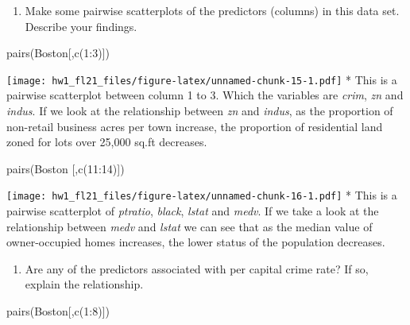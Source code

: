 \documentclass[
]{article}
\newenvironment{Shaded}{\begin{snugshade}}{\end{snugshade}}
\newcommand{\DecValTok}[1]{\textcolor[rgb]{0.00,0.00,0.81}{#1}}
\newcommand{\FunctionTok}[1]{\textcolor[rgb]{0.00,0.00,0.00}{#1}}
\newcommand{\NormalTok}[1]{#1}
\newcommand{\SpecialCharTok}[1]{\textcolor[rgb]{0.00,0.00,0.00}{#1}}
\providecommand{\tightlist}{%
  \setlength{\itemsep}{0pt}\setlength{\parskip}{0pt}}
\begin{document}
\begin{enumerate}
\def\labelenumi{(\alph{enumi})}
\setcounter{enumi}{1}
\tightlist
\item
  Make some pairwise scatterplots of the predictors (columns) in this
  data set. Describe your findings.
\end{enumerate}

\begin{Shaded}
\begin{Highlighting}[]
\FunctionTok{pairs}\NormalTok{(Boston[,}\FunctionTok{c}\NormalTok{(}\DecValTok{1}\SpecialCharTok{:}\DecValTok{3}\NormalTok{)])}
\end{Highlighting}
\end{Shaded}

\texttt{[image: hw1\_fl21\_files/figure-latex/unnamed-chunk-15-1.pdf]} *
This is a pairwise scatterplot between column 1 to 3. Which the
variables are \emph{crim}, \emph{zn} and \emph{indus}. If we look at the
relationship between \emph{zn} and \emph{indus}, as the proportion of
non-retail business acres per town increase, the proportion of
residential land zoned for lots over 25,000 sq.ft decreases.

\begin{Shaded}
\begin{Highlighting}[]
\FunctionTok{pairs}\NormalTok{(Boston [,}\FunctionTok{c}\NormalTok{(}\DecValTok{11}\SpecialCharTok{:}\DecValTok{14}\NormalTok{)])}
\end{Highlighting}
\end{Shaded}

\texttt{[image: hw1\_fl21\_files/figure-latex/unnamed-chunk-16-1.pdf]} *
This is a pairwise scatterplot of \emph{ptratio}, \emph{black},
\emph{lstat} and \emph{medv}. If we take a look at the relationship
between \emph{medv} and \emph{lstat} we can see that as the median value
of owner-occupied homes increases, the lower status of the population
decreases.

\begin{enumerate}
\def\labelenumi{(\alph{enumi})}
\setcounter{enumi}{2}
\tightlist
\item
  Are any of the predictors associated with per capital crime rate? If
  so, explain the relationship.
\end{enumerate}

\begin{Shaded}
\begin{Highlighting}[]
\FunctionTok{pairs}\NormalTok{(Boston[,}\FunctionTok{c}\NormalTok{(}\DecValTok{1}\SpecialCharTok{:}\DecValTok{8}\NormalTok{)])}
\end{Highlighting}
\end{Shaded}
\end{document}
